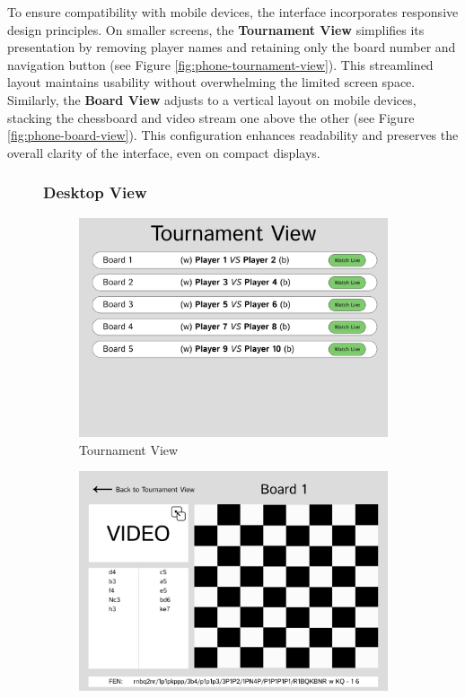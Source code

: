 To ensure compatibility with mobile devices, the interface incorporates responsive design principles. On smaller screens, the \textbf{Tournament View} simplifies its presentation by removing player names and retaining only the board number and navigation button (see Figure \ref{fig:phone-tournament-view}). This streamlined layout maintains usability without overwhelming the limited screen space.
Similarly, the \textbf{Board View} adjusts to a vertical layout on mobile devices, stacking the chessboard and video stream one above the other (see Figure \ref{fig:phone-board-view}). This configuration enhances readability and preserves the overall clarity of the interface, even on compact displays.


\begin{figure}[h!]
\subsubsection*{Desktop View}
    \centering
    \begin{subfigure}[h!]{0.40\linewidth}
        \centering
        \includegraphics[width=\linewidth]{figures/methods/wireframes/desktop-tournament-view.png}
        \caption{Tournament View}
        \label{fig:desktop-tournament-view}
    \end{subfigure}
    \hfill
    \begin{subfigure}[h!]{0.40\linewidth}
        \centering
        \includegraphics[width=\linewidth]{figures/methods/wireframes/desktop-board-view.png}

\end{subfigure}
\end{figure}
